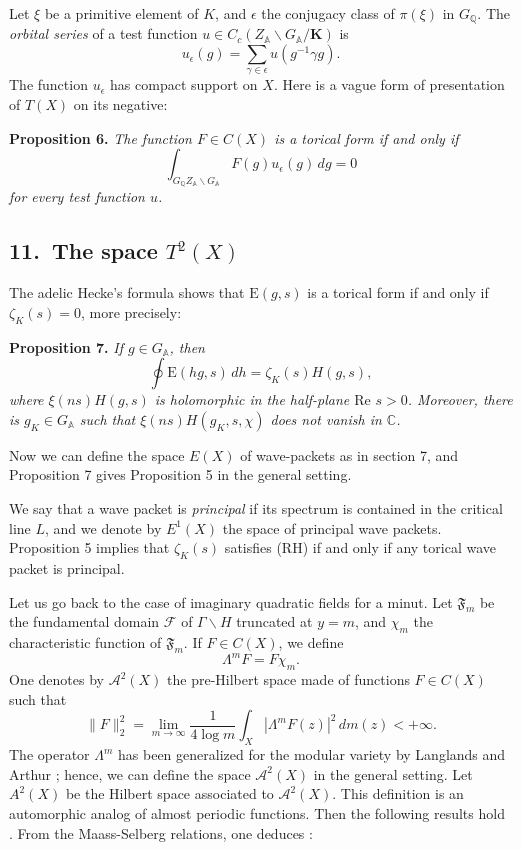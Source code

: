 \documentclass[12pt]{article}
\begin{document}
Let $\xi$ be a primitive element of $K$, and $\epsilon$ the conjugacy class of $\pi(\xi)$ in $G_{\mathbb{Q}}$. The \emph{orbital series} of a test function $u \in C_c(Z_{\mathbb{A}} \backslash G_{\mathbb{A}} / \mathbf{K})$ is
\[
u_{\epsilon}(g) = \sum_{\gamma \in \epsilon} u(g^{-1} \gamma g).
\]
The function $u_{\epsilon}$ has compact support on $X$. Here is a vague form of presentation of $T(X)$ on its negative:

\medskip

\noindent
\textbf{Proposition 6.} \emph{The function $F \in C(X)$ is a torical form if and only if}
\[
\int_{G_{\mathbb{Q}} Z_{\mathbb{A}} \backslash G_{\mathbb{A}}} F(g) u_{\epsilon}(g)\,dg = 0
\]
\emph{for every test function $u$.}

\subsection*{11.\ The space $T^2(X)$}

The adelic Hecke's formula \cite{L1} shows that $\text{E}(g, s)$ is a torical form if and only if $\zeta_K(s) = 0$, more precisely:

\medskip

\noindent
\textbf{Proposition 7.} \emph{If $g \in G_{\mathbb{A}}$, then}
\[
\oint \text{E}(hg, s)\,dh = \zeta_K(s) H(g, s),
\]
\emph{where $\xi(ns) H(g, s)$ is holomorphic in the half-plane $\text{Re } s > 0$. Moreover, there is $g_K \in G_{\mathbb{A}}$ such that $\xi(ns) H(g_K, s, \chi)$ does not vanish in $\mathbb{C}$.}

\medskip

Now we can define the space $E(X)$ of wave-packets as in section 7, and Proposition 7 gives Proposition 5 in the general setting.

We say that a wave packet is \emph{principal} if its spectrum is contained in the critical line $L$, and we denote by $E^1(X)$ the space of principal wave packets. Proposition 5 implies that $\zeta_K(s)$ satisfies (RH) if and only if any torical wave packet is principal.

\medskip

Let us go back to the case of imaginary quadratic fields for a minut. Let $\mathfrak{F}_{m}$ be the fundamental domain $\mathcal{F}$ of $\Gamma \backslash H$ truncated at $y = m$, and $\chi_{m}$ the characteristic function of $\mathfrak{F}_{m}$. If $F \in C(X)$, we define
\[
\Lambda^{m} F = F \chi_{m}.
\]
One denotes by $\mathcal{A}^{2}(X)$ the pre-Hilbert space made of functions $F \in C(X)$ such that
\[
\|F\|_{2}^{2} = \lim_{m \to \infty} \frac{1}{4 \log m} \int_{X} |\Lambda^{m} F(z)|^{2}\,dm(z) < +\infty.
\]
The operator $\Lambda^{m}$ has been generalized for the modular variety by Langlands and Arthur \cite{A}; hence, we can define the space $\mathcal{A}^{2}(X)$ in the general setting. Let $A^{2}(X)$ be the Hilbert space associated to $\mathcal{A}^{2}(X)$. This definition is an automorphic analog of almost periodic functions. Then the following results hold \cite{L1,L2}. From the Maass-Selberg relations, one deduces :
\end{document}
